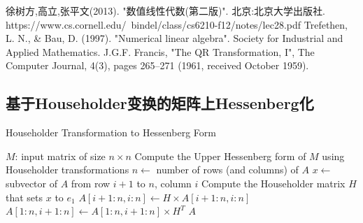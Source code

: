 \documentclass[12pt, a4paper, oneside]{ctexart}
\begin{document}
\begin{thebibliography}{99}
    徐树方,高立,张平文(2013). "数值线性代数(第二版)". 北京:北京大学出版社.
    https://www.cs.cornell.edu/~bindel/class/cs6210-f12/notes/lec28.pdf
    Trefethen, L. N., \& Bau, D. (1997). "Numerical linear algebra". Society for Industrial and Applied Mathematics.
    J.G.F. Francis, "The QR Transformation, I", The Computer Journal, 4(3), pages 265–271 (1961, received October 1959).
\end{thebibliography}

\newpage

\begin{appendices}
    \renewcommand{\thesection}{\Alph{section}}
    \section{基于Householder变换的矩阵上Hessenberg化}
    \begin{algorithm}
        \caption{Householder Transformation to Hessenberg Form}
        \begin{algorithmic}[1]
            \Require $M$: input matrix of size $n \times n$
            \Ensure Compute the Upper Hessenberg form of $M$ using Householder transformations
                \State $n \gets$ number of rows (and columns) of $A$
                    \State $x \gets$ subvector of $A$ from row $i+1$ to $n$, column $i$
                    \State Compute the Householder matrix $H$ that sets $x$ to $e_1$
                    \State $A[i+1:n, i:n] \gets H \times A[i+1:n, i:n]$
                    \State $A[1:n, i+1:n] \gets A[1:n, i+1:n] \times H^T$
                \EndFor
                \State \Return $A$
            \EndFunction
        \end{algorithmic}
    \end{algorithm}
\end{appendices}
\newpage
\end{document}
